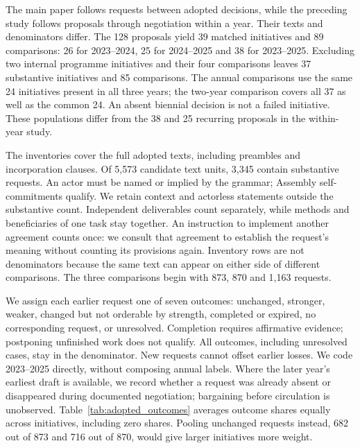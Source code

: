 \documentclass[10pt,authoryear]{elsarticle}
\begin{document}
The main paper follows requests between adopted decisions, while the preceding study follows proposals through negotiation within a year. Their texts and denominators differ. The 128 proposals yield 39 matched initiatives and 89 comparisons: 26 for 2023--2024, 25 for 2024--2025 and 38 for 2023--2025. Excluding two internal programme initiatives and their four comparisons leaves 37 substantive initiatives and 85 comparisons. The annual comparisons use the same 24 initiatives present in all three years; the two-year comparison covers all 37 as well as the common 24. An absent biennial decision is not a failed initiative. These populations differ from the 38 and 25 recurring proposals in the within-year study.

The inventories cover the full adopted texts, including preambles and incorporation clauses. Of 5,573 candidate text units, 3,345 contain substantive requests. An actor must be named or implied by the grammar; Assembly self-commitments qualify. We retain context and actorless statements outside the substantive count. Independent deliverables count separately, while methods and beneficiaries of one task stay together. An instruction to implement another agreement counts once: we consult that agreement to establish the request's meaning without counting its provisions again. Inventory rows are not denominators because the same text can appear on either side of different comparisons. The three comparisons begin with 873, 870 and 1,163 requests.

We assign each earlier request one of seven outcomes: unchanged, stronger, weaker, changed but not orderable by strength, completed or expired, no corresponding request, or unresolved. Completion requires affirmative evidence; postponing unfinished work does not qualify. All outcomes, including unresolved cases, stay in the denominator. New requests cannot offset earlier losses. We code 2023--2025 directly, without composing annual labels. Where the later year's earliest draft is available, we record whether a request was already absent or disappeared during documented negotiation; bargaining before circulation is unobserved. Table~\ref{tab:adopted_outcomes} averages outcome shares equally across initiatives, including zero shares. Pooling unchanged requests instead, 682 out of 873 and 716 out of 870, would give larger initiatives more weight.
\end{document}
